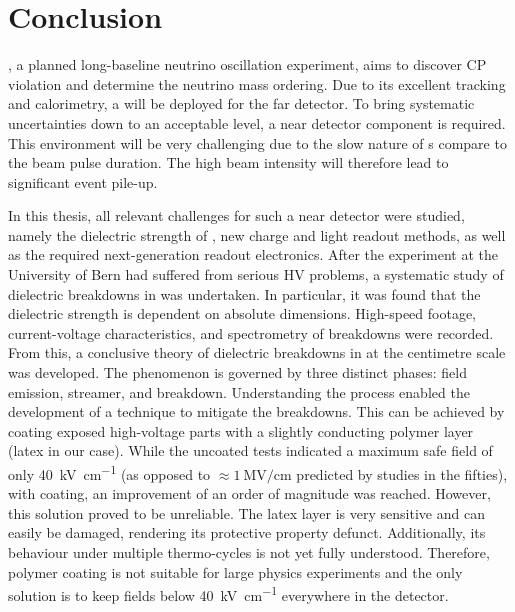 \chapter{Conclusion}
\label{chap:conclusion}

\dune{}, a planned long-baseline neutrino oscillation experiment, aims to discover CP violation and determine the neutrino mass ordering.
Due to its excellent tracking and calorimetry, a \lartpc{} will be deployed for the far detector.
To bring systematic uncertainties down to an acceptable level, a near detector \lartpc{} component is required.
This environment will be very challenging due to the slow nature of \lartpc{}s compare to the beam pulse duration.
The high beam intensity will therefore lead to significant event pile-up.

In this thesis, all relevant challenges for such a near detector \lartpc{} were studied, namely the dielectric strength of \lar{}, new charge and light readout methods, as well as the required next-generation readout electronics.
After the \AT{} experiment at the University of Bern had suffered from serious HV problems, a systematic study of dielectric breakdowns in \lar{} was undertaken.
In particular, it was found that the dielectric strength is dependent on absolute dimensions.
High-speed footage, current-voltage characteristics, and spectrometry of breakdowns were recorded.
From this, a conclusive theory of dielectric breakdowns in \lar{} at the centimetre scale was developed.
The phenomenon is governed by three distinct phases: field emission, streamer, and breakdown.
Understanding the process enabled the development of a technique to mitigate the breakdowns.
This can be achieved by coating exposed high-voltage parts with a slightly conducting polymer layer (latex in our case).
While the uncoated tests indicated a maximum safe field of only \SI{40}{\kilo\volt\per\centi\metre} (as opposed to $\approx \SI{1}{\mega\volt\per\centi\metre}$ predicted by studies in the fifties), with coating, an improvement of an order of magnitude was reached.
However, this solution proved to be unreliable.
The latex layer is very sensitive and can easily be damaged, rendering its protective property defunct.
Additionally, its behaviour under multiple thermo-cycles is not yet fully understood.
Therefore, polymer coating is not suitable for large physics experiments and the only solution is to keep fields below \SI{40}{\kilo\volt\per\centi\metre} everywhere in the detector.

